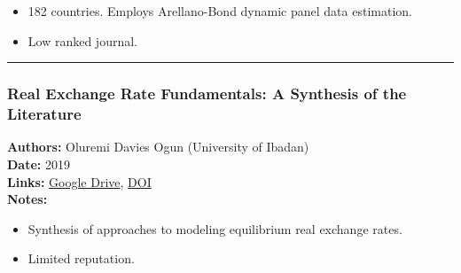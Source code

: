 \documentclass[
  11pt,
]{article}
\providecommand{\tightlist}{%
  \setlength{\itemsep}{0pt}\setlength{\parskip}{0pt}}
\begin{document}
\begin{itemize}
\tightlist
\item
  182 countries. Employs Arellano-Bond dynamic panel data estimation.
\item
  Low ranked journal.
\end{itemize}

\begin{center}\rule{0.5\linewidth}{0.5pt}\end{center}

\subsubsection{Real Exchange Rate Fundamentals: A Synthesis of the
Literature}\label{real-exchange-rate-fundamentals-a-synthesis-of-the-literature-1}

\textbf{Authors:} Oluremi Davies Ogun (University of Ibadan)\\
\textbf{Date:} 2019\\
\textbf{Links:}
\href{https://drive.google.com/file/d/1SIhMMtsybhiY3eJg-oGcCAvoqJPDKXtQ/view?usp=sharing}{Google
Drive}, \href{https://doi.org/10.6000/1929-7092.2019.08.36}{DOI}\\
\textbf{Notes:}

\begin{itemize}
\tightlist
\item
  Synthesis of approaches to modeling equilibrium real exchange rates.
\item
  Limited reputation.
\end{itemize}


\printbibliography
\end{document}
